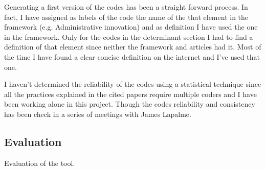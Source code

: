 Generating a first version of the codes has been a straight forward process. In fact, I have assigned as labels of the code the name of the that element in the framework (e.g. Administrative innovation) and as definition I have used the one in the framework. Only for the codes in the determinant section I had to find a definition of that element since neither the framework and articles had it. Most of the time I have found a clear concise definition on the internet and I've used that one.


I haven't determined the reliability of the codes using a statistical technique since all the practices explained in the cited papers require multiple coders and I have been working alone in this project. Though the codes reliability and consistency has been check in a series of meetings with James Lapalme.

\subsection{Evaluation}
Evaluation of the tool.

